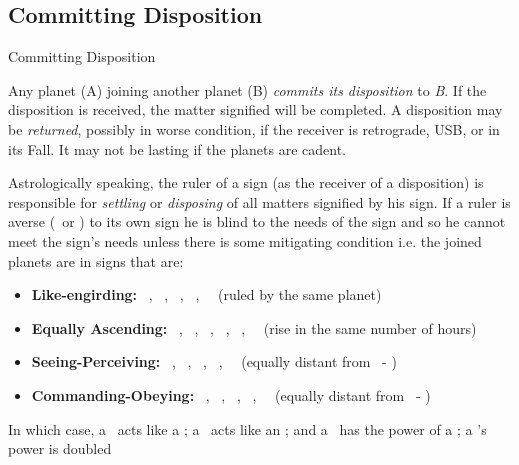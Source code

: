 \subsection{Committing Disposition}
\begin{frame}[t]{Committing Disposition}
\small
\begin{block}{}
Any planet (A) joining another planet (B) \textsl{commits its disposition} to \textsl{B}. If the disposition is received, the matter signified will be completed. A disposition may be \textsl{returned}, possibly in worse condition, if the receiver is retrograde, USB, or in its Fall.  It may not be lasting if the planets are cadent.
\end{block}

Astrologically speaking, the ruler of a sign (as the receiver of a disposition) is responsible for \textsl{settling} or \textsl{disposing} of all matters signified by his sign. If a ruler is averse (\Semisextile\ or \Quincunx) to its own sign he is blind to the needs of the sign  and so he cannot meet the sign's needs unless there is some mitigating condition i.e. the joined planets are in signs that are:\footnotemark[1]
\vspace{-0.25cm}
\begin{itemize}
\item \textbf{Like-engirding:}  \Aries\ \Scorpio, \Taurus\  \Libra, \Gemini\ \Virgo, \Sagittarius\ \Pisces,  \Capricorn\ \Aquarius\ (ruled by the same planet)

\item \textbf{Equally Ascending:}  \Aries\ \Pisces, \Taurus\ \Aquarius, \Gemini\ \Capricorn, \Cancer\ \Sagittarius, \Leo\ \Scorpio, \Virgo\ \Libra\ (rise in the same number of hours)

\item \textbf{Seeing-Perceiving:} \Aries\ \Libra, \Taurus\ \Virgo, \Gemini\ \Leo, \Scorpio\ \Pisces, \Sagittarius\ \Aquarius\ (equally distant from \Cancer\ - \Capricorn)

\item \textbf{Commanding-Obeying:} \Taurus\ \Pisces, \Gemini\ \Aquarius, \Cancer\ \Capricorn, \Leo\ \Sagittarius, \Virgo\ \Scorpio\ (equally distant from \Aries\ - \Libra)
\end{itemize}
\vspace{-0.25cm}
In which case, a \Semisextile\ acts like a \Conjunction; a \Quincunx\ acts like an \Opposition; and a \Sextile\ has the power of a \Trine; a \Square's power is doubled

\end{frame}
